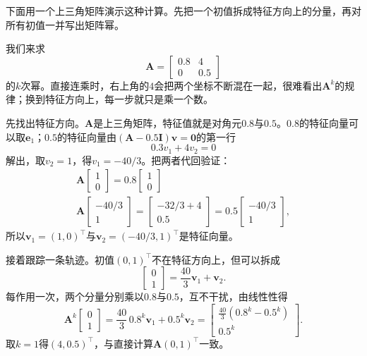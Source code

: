 下面用一个上三角矩阵演示这种计算。先把一个初值拆成特征方向上的分量，再对所有初值一并写出矩阵幂。
\begin{example}[用特征向量计算矩阵幂]
\label{ex:ls-triangular-power}
我们来求
\[
 \bm A=\begin{bmatrix}0.8&4\\0&0.5\end{bmatrix}
\]
的$k$次幂。直接连乘时，右上角的$4$会把两个坐标不断混在一起，很难看出$\bm A^k$的规律；换到特征方向上，每一步就只是乘一个数。

先找出特征方向。$\bm A$是上三角矩阵，特征值就是对角元$0.8$与$0.5$。$0.8$的特征向量可以取$\bm e_1$；$0.5$的特征向量由$(\bm A-0.5\bm I)\bm v=\bm0$的第一行
\[
 0.3v_1+4v_2=0
\]
解出，取$v_2=1$，得$v_1=-40/3$。把两者代回验证：
\[
\begin{gathered}
\bm A\begin{bmatrix}1\\0\end{bmatrix}=0.8\begin{bmatrix}1\\0\end{bmatrix}\\
\bm A\begin{bmatrix}-40/3\\1\end{bmatrix}
 =\begin{bmatrix}-32/3+4\\0.5\end{bmatrix}
 =0.5\begin{bmatrix}-40/3\\1\end{bmatrix},
\end{gathered}
\]
所以$\bm v_1=(1,0)^{\top}$与$\bm v_2=(-40/3,1)^{\top}$是特征向量。

接着跟踪一条轨迹。初值$(0,1)^{\top}$不在特征方向上，但可以拆成
\[
 \begin{bmatrix}0\\1\end{bmatrix}=\frac{40}{3}\bm v_1+\bm v_2 .
\]
每作用一次，两个分量分别乘以$0.8$与$0.5$，互不干扰，由线性性得
\[
 \bm A^k\begin{bmatrix}0\\1\end{bmatrix}
 =\frac{40}{3}\,0.8^k\bm v_1+0.5^k\bm v_2
 =\begin{bmatrix}\tfrac{40}{3}(0.8^k-0.5^k)\\0.5^k\end{bmatrix}.
\]
取$k=1$得$(4,0.5)^{\top}$，与直接计算$\bm A(0,1)^{\top}$一致。


\end{example}
